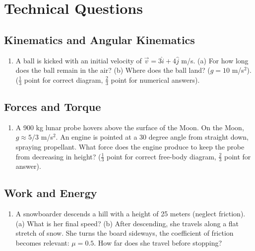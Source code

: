 \documentclass[10pt]{article}
\begin{document}
\section{Technical Questions}
\subsection{Kinematics and Angular Kinematics}
\begin{enumerate}
\item A ball is kicked with an initial velocity of $\vec{v} = 3\hat{i}+4\hat{j}$ m/s. (a) For how long does the ball remain in the air?  (b) Where does the ball land? ($g=10$ m/s$^2$). ($\frac{1}{3}$ point for correct diagram, $\frac{2}{3}$ point for numerical answers). \\ \vspace{1.5cm}
\end{enumerate}
\subsection{Forces and Torque}
\begin{enumerate}
\item A 900 kg lunar probe hovers above the surface of the Moon.  On the Moon, $g \approx 5/3$ m/s$^2$.  An engine is pointed at a 30 degree angle from straight down, spraying propellant.  What force does the engine produce to keep the probe from decreasing in height?  ($\frac{1}{3}$ point for correct free-body diagram, $\frac{2}{3}$ point for answer).  \\ \vspace{1.5cm}
\end{enumerate}
\subsection{Work and Energy}
\begin{enumerate}
\item A snowboarder descends a hill with a height of 25 meters (neglect friction).  (a) What is her final speed?  (b) After descending, she travels along a flat stretch of snow.  She turns the board sideways, the coefficient of friction becomes relevant: $\mu = 0.5$.  How far does she travel before stopping? \\ \vspace{1.5cm}
\end{enumerate}
\end{document}
